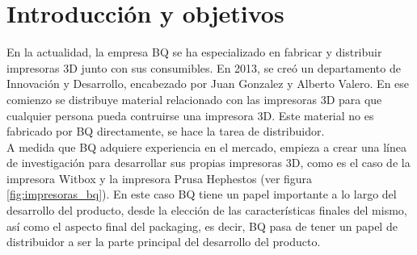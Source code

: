 \chapter{Introducción y objetivos}
\label{cap:introduccion}

En la actualidad, la empresa BQ se ha especializado en fabricar y distribuir impresoras 3D junto con sus consumibles. En 2013, se creó un departamento de Innovación y Desarrollo, encabezado por Juan Gonzalez y Alberto Valero. En ese comienzo se distribuye material relacionado con las impresoras 3D para que cualquier persona pueda contruirse una impresora 3D. Este material no es fabricado por BQ directamente, se hace la tarea de distribuidor.\\

A medida que BQ adquiere experiencia en el mercado, empieza a crear una línea de investigación para desarrollar sus propias impresoras 3D, como es el caso de la impresora Witbox y la impresora Prusa Hephestos (ver figura \ref{fig:impresoras_bq}). En este caso BQ tiene un papel importante a lo largo del desarrollo del producto, desde la elección de las características finales del mismo, así como el aspecto final del packaging, es decir, BQ pasa de tener un papel de distribuidor a ser la parte principal del desarrollo del producto.\\


